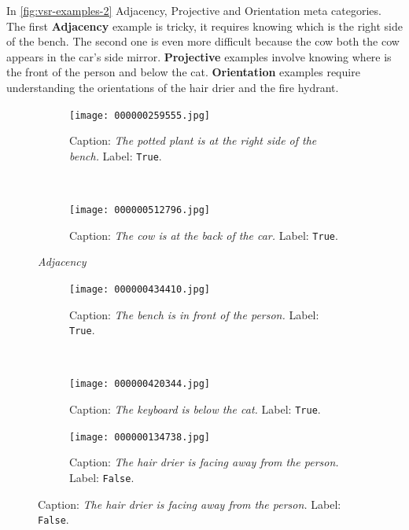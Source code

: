 In \cref{fig:vsr-examples-2} Adjacency, Projective and Orientation meta categories. The first \textbf{Adjacency} example is tricky, it requires knowing which is the right side of the bench. The second one is even more difficult because the cow both the cow appears in the car’s side mirror. \textbf{Projective} examples involve knowing where is the front of the person and below the cat. \textbf{Orientation} examples require understanding the orientations of the hair drier and the fire hydrant.

\begin{figure}[ht]
\centering
    \begin{minipage}[t]{.30\textwidth}
        \begin{subfigure}[t]{\textwidth}
        \centering
        \texttt{[image: 000000259555.jpg]}
        \caption{Caption: \textit{The potted plant is at the right side of the bench.} Label: \texttt{True}.}
        \end{subfigure}\\
        \begin{subfigure}[t]{\textwidth}
        \centering
        \texttt{[image: 000000512796.jpg]}
        \caption{Caption: \textit{The cow is at the back of the car.} Label: \texttt{True}.}
        \end{subfigure}%
        \caption*{\textit{Adjacency}}
    \end{minipage}
    \hfill
    \begin{minipage}[t]{.30\textwidth}
        \begin{subfigure}[t]{\textwidth}
        \centering
        \texttt{[image: 000000434410.jpg]}
        \caption{Caption: \textit{The bench is in front of the person.} Label: \texttt{True}.}
        \end{subfigure}\\
        \begin{subfigure}[t]{\textwidth}
        \centering
        \texttt{[image: 000000420344.jpg]}
        \caption{Caption: \textit{The keyboard is below the cat.} Label: \texttt{True}.}
        \end{subfigure}%
        \caption*{\textit{Projective}}
    \end{minipage}
    \hfill
    \begin{minipage}[t]{.30\textwidth}
        \begin{subfigure}[t]{\textwidth}
        \centering
        \texttt{[image: 000000134738.jpg]}
        \caption{Caption: \textit{The hair drier is facing away from the person.} Label: \texttt{False}.}

\end{subfigure}
\end{minipage}
\end{figure}
